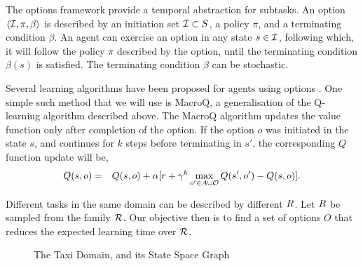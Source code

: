 The options framework provide a temporal abstraction for subtasks. An
option $\langle  \mathcal{I},\pi,\beta \rangle$ is described by an initiation set $\mathcal{I} \subset
S$, a policy $\pi$, and a terminating condition $\beta$.  An agent
can exercise an option in any state $s \in \mathcal{I}$, following which,
it will follow the policy $\pi$ described by the option, until the
terminating condition $\beta(s)$ is satisfied. The terminating condition
$\beta$ can be stochastic.

Several learning algorithms have been proposed for agents using options
\cite{SuttonPrecupSingh1999,BartoMahadevan2003}. One simple such method that
we will use is MacroQ, a generalisation of the Q-learning algorithm
described above. The MacroQ algorithm updates the value function only
after completion of the option. If the option $o$ was initiated in the
state $s$, and continues for $k$ steps before terminating in $s'$, the
corresponding $Q$ function update will be,
\begin{eqnarray*}
    Q(s,o) &=& Q(s,o) + \alpha [ r + \gamma^{k} \max_{o' \in A \cup \mathcal{O}} Q(s',o') - Q(s,o) ].
\end{eqnarray*}

Different tasks in the same domain can be described by different
$R$. Let $R$ be sampled from the family $\mathcal{R}$. Our
objective then is to find a set of options $O$ that reduces the expected
learning time over $\mathcal{R}$.

\begin{figure}[th]
    \center
    \subfigure{
      
      \label{fig:taxi-domain}
    }
    \caption{The Taxi Domain, and its State Space Graph}
\end{figure}

